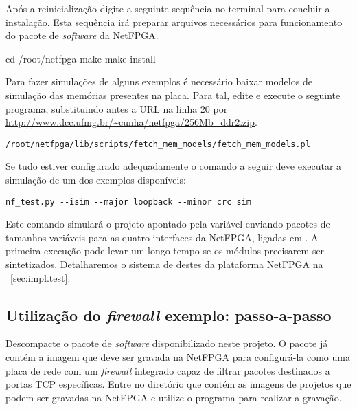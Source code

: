 Após a reinicialização digite a seguinte sequência no terminal para
concluir a instalação.  Esta sequência irá preparar arquivos necessários
para funcionamento do pacote de \emph{software} da NetFPGA.

\begin{verbnobox}[\small]
cd /root/netfpga
make
make install
\end{verbnobox}

Para fazer simulações de alguns exemplos é necessário baixar modelos de
simulação das memórias presentes na placa. Para tal, edite e execute o
seguinte programa, substituindo antes a URL na linha 20 por
{\small\url{http://www.dcc.ufmg.br/~cunha/netfpga/256Mb_ddr2.zip}}.

\begin{verbatim}
/root/netfpga/lib/scripts/fetch_mem_models/fetch_mem_models.pl
\end{verbatim}

\newpage
Se tudo estiver configurado adequadamente o comando a seguir deve executar a simulação de um dos exemplos disponíveis:

\begin{verbatim}
nf_test.py --isim --major loopback --minor crc sim
\end{verbatim}

Este comando simulará o projeto apontado pela variável
 enviando pacotes de tamanhos variáveis para as
quatro interfaces da NetFPGA, ligadas em . A primeira
execução pode levar um longo tempo se os módulos precisarem ser
sintetizados.  Detalharemos o sistema de destes da plataforma NetFPGA na
\secstr~\ref{sec:impl.test}.

\subsection{Utilização do \emph{firewall} exemplo: passo-a-passo}


Descompacte o pacote de \emph{software} disponibilizado neste
projeto.\footnotemark{} O pacote já contém a imagem que deve ser gravada
na NetFPGA para configurá-la como uma placa de rede com um
\emph{firewall} integrado capaz de filtrar pacotes destinados a portas
TCP específicas.  Entre no diretório que contém as imagens de projetos
que podem ser gravadas na NetFPGA e utilize o programa
 para realizar a gravação.


